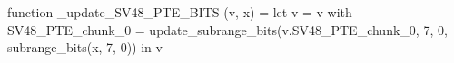 function _update_SV48_PTE_BITS (v, x) = let v = { v with SV48_PTE_chunk_0 = update_subrange_bits(v.SV48_PTE_chunk_0, 7, 0, subrange_bits(x, 7, 0)) } in
  v
